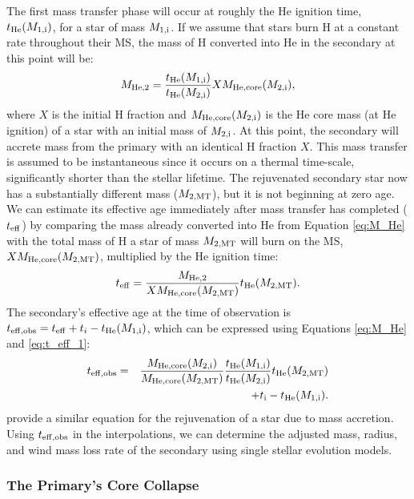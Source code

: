 \documentclass[usenatbib]{mnras}
\begin{document}
The first mass transfer phase will occur at roughly the He ignition time, $t_{\rm He} (M_{\rm 1,i})$, for a star of mass $M_{\rm 1,i}$. If we assume that stars burn H at a constant rate throughout their MS, the mass of H converted into He in the secondary at this point will be:
\begin{equation}
M_{\rm He,2} = \frac{t_{\rm He}(M_{\rm 1,i})}{t_{\rm He}(M_{\rm 2,i})} X M_{\rm He,core}(M_{\rm 2,i}), \label{eq:M_He}
\end{equation}
where $X$ is the initial H fraction and $M_{\rm He,core}(M_{\rm 2,i})$ is the He core mass (at He ignition) of a star with an initial mass of $M_{\rm 2,i}$. At this point, the secondary will accrete mass from the primary with an identical H fraction $X$. This mass transfer is assumed to be instantaneous since it occurs on a thermal time-scale, significantly shorter than the stellar lifetime. The rejuvenated secondary star now has a substantially different mass ($M_{\rm 2, MT}$), but it is not beginning at zero age. We can estimate its effective age immediately after mass transfer has completed ($t_{\rm eff}$) by comparing the mass already converted into He from Equation \ref{eq:M_He} with the total mass of H a star of mass $M_{\rm 2, MT}$ will burn on the MS, $X M_{\rm He,core}(M_{\rm 2, MT})$, multiplied by the He ignition time:
\begin{equation}
t_{\rm eff} = \frac{M_{\rm He, 2}}{X M_{\rm He, core} (M_{\rm 2, MT}) } t_{\rm He} (M_{\rm 2, MT}). \label{eq:t_eff_1}
\end{equation}
The secondary's effective age at the time of observation is $t_{\rm eff,obs} = t_{\rm eff} + t_i - t_{\rm He}(M_{\rm 1,i})$, which can be expressed using Equations \ref{eq:M_He} and \ref{eq:t_eff_1}:
\begin{eqnarray}
t_{\rm eff,obs} &=& \frac{M_{\rm He,core}(M_{\rm 2,i})}{M_{\rm He,core}(M_{\rm 2, MT})} \frac{t_{\rm He}(M_{\rm 1,i})}{t_{\rm He}(M_{\rm 2,i})} t_{\rm He}(M_{\rm 2, MT}) \nonumber \\
 & & \qquad + t_{\rm i} - t_{\rm He}(M_{\rm 1,i}). \label{eq:t_eff_obs_full}
\end{eqnarray}
\citet{tout97} provide a similar equation for the rejuvenation of a star due to mass accretion. Using $t_{\rm eff,obs}$ in the interpolations, we can determine the adjusted mass, radius, and wind mass loss rate of the secondary using single stellar evolution models. 



\subsubsection{The Primary's Core Collapse} \label{sec:trans_SN}
\end{document}
